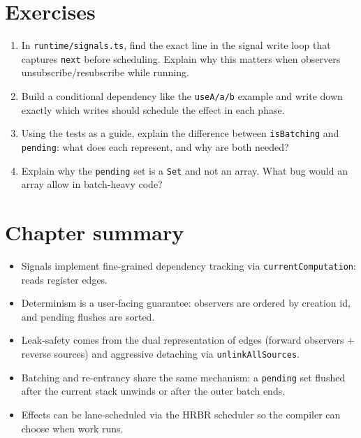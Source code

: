 \section{Exercises}

\begin{enumerate}
  \item In \texttt{runtime/signals.ts}, find the exact line in the signal write loop that captures \texttt{next} before scheduling. Explain why this matters when observers unsubscribe/resubscribe while running.
  \item Build a conditional dependency like the \texttt{useA/a/b} example and write down exactly which writes should schedule the effect in each phase.
  \item Using the tests as a guide, explain the difference between \texttt{isBatching} and \texttt{pending}: what does each represent, and why are both needed?
  \item Explain why the \texttt{pending} set is a \texttt{Set} and not an array. What bug would an array allow in batch-heavy code?
\end{enumerate}

\section{Chapter summary}

\begin{itemize}
  \item Signals implement fine-grained dependency tracking via \texttt{currentComputation}: reads register edges.
  \item Determinism is a user-facing guarantee: observers are ordered by creation id, and pending flushes are sorted.
  \item Leak-safety comes from the dual representation of edges (forward observers + reverse sources) and aggressive detaching via \texttt{unlinkAllSources}.
  \item Batching and re-entrancy share the same mechanism: a \texttt{pending} set flushed after the current stack unwinds or after the outer batch ends.
  \item Effects can be lane-scheduled via the HRBR scheduler so the compiler can choose when work runs.
\end{itemize}

